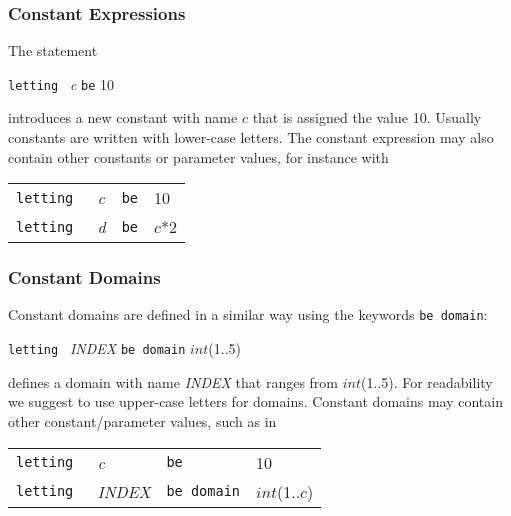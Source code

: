 \documentclass{article}
\begin{document}
\subsubsection{Constant Expressions}
The statement
\begin{center}
{\tt letting } {\em c} {\tt be} 10
\end{center}
introduces a new constant with name $c$ that is assigned the value
10. Usually constants are written with lower-case letters. The
constant expression may also contain other constants or parameter
values, for instance with
\begin{center}
\begin{tabular}{llll}
{\tt letting } & {\em c}& {\tt be}& 10\\
{\tt letting } &{\em d} &{\tt be}& $c$*2\\
\end{tabular}
\end{center}

\subsubsection{Constant Domains}
Constant domains are defined in a similar way using 
the keywords {\tt be domain}:
\begin{center}
{\tt letting } {\em INDEX} {\tt be domain} $int$(1..5)
\end{center}
defines a domain with name {\em INDEX} that ranges 
from $int$(1..5).
For readability we suggest to use upper-case letters for domains.
 Constant domains may contain other 
constant/parameter values, such as in
\begin{center}
\begin{tabular}{llll}
{\tt letting } & {\em c}& {\tt be} &10\\
{\tt letting } &{\em INDEX}& {\tt be domain} &$int$(1..$c$) \\
\end{tabular}
\end{center}
\end{document}
